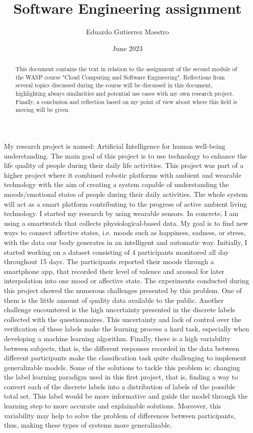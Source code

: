 \documentclass[11pt]{article}
\title{Software Engineering assignment}
\author{Eduardo Gutierrez Maestro}
\date{June 2023}
\begin{document}
\maketitle

\begin{abstract}
    This document contains the text in relation to the assignment of the second module of the WASP course "Cloud Computing and Software Engineering". Reflections from several topics discussed during the course will be discussed in this document, highlighting always similarities and potential use cases with my own research project. Finally, a conclusion and reflection based on my point of view about where this field is moving will be given. 
\end{abstract}
My research project is named: Artificial Intelligence for human well-being understanding. The main goal of this project is to use technology to enhance the life quality of people during their daily life activities. This project was part of a higher project where it combined robotic platforms with ambient and wearable technology with the aim of creating a system capable of understanding the moods/emotional states of people during their daily activities. The whole system will act as a smart platform contributing to the progress of active ambient living technology.
I started my research by using wearable sensors. In concrete, I am using a smartwatch that collects physiological-based data. My goal is to find new ways to connect affective states, i.e. moods such as happiness, sadness, or stress, with the data our body generates in an intelligent and automatic way. Initially, I started working on a dataset consisting of 4 participants monitored all day throughout 15 days. The participants reported their moods through a smartphone app, that recorded their level of valence and arousal for later interpolation into one mood or affective state.
The experiments conducted during this project showed the numerous challenges presented by this problem. One of them is the little amount of quality data available to the public. Another challenge encountered is the high uncertainty presented in the discrete labels collected with the questionnaires. This uncertainty and lack of control over the verification of these labels make the learning process a hard task, especially when developing a machine learning algorithm. Finally, there is a high variability between subjects, that is, the different responses recorded in the data between different participants make the classification task quite challenging to implement generalizable models. Some of the solutions to tackle this problem is: changing the label learning paradigm used in this first project, that is, finding a way to convert each of the discrete labels into a distribution of labels of the possible total set. This label would be more informative and guide the model through the learning step to more accurate and explainable solutions. Moreover, this variability may help to solve the problem of differences between participants, thus, making these types of systems more generalizable. 
\end{document}
